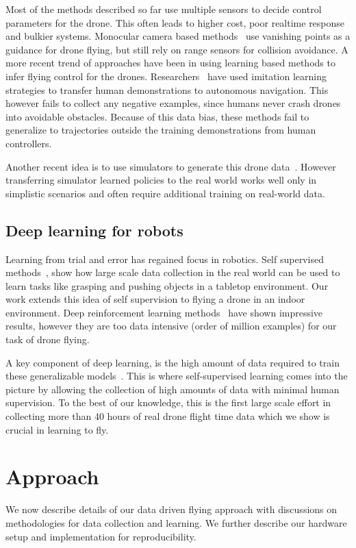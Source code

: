 \documentclass[letterpaper, 10 pt, conference]{ieeeconf}  %
\begin{document}
Most of the methods described so far use multiple sensors to decide control parameters for the drone. This often leads to higher cost, poor realtime response and bulkier systems. Monocular camera based methods~\cite{bills2011autonomous} use vanishing points as a guidance for drone flying, but still rely on range sensors for collision avoidance. A more recent trend of approaches have been in using learning based methods to infer flying control for the drones. Researchers~\cite{ross2013learning} have used imitation learning strategies to transfer human demonstrations to autonomous navigation. This however fails to collect any negative examples, since humans never crash drones into avoidable obstacles. Because of this data bias, these methods fail to generalize to trajectories outside the training demonstrations from human controllers.

Another recent idea is to use simulators to generate this drone data~\cite{dey_MSR,DBLP:journals/corr/SadeghiL16}. However transferring simulator learned policies to the real world works well only in simplistic scenarios and often require additional training on real-world data.

\subsection{Deep learning for robots}
Learning from trial and error has regained focus in robotics. Self supervised methods~\cite{ levine2016learning, agrawal2016learning, DBLP:journals/corr/PintoG16, pinto2016supersizing}, show how large scale data collection in the real world can be used to learn tasks like grasping and pushing objects in a tabletop environment. Our work extends this idea of self supervision to flying a drone in an indoor environment. Deep reinforcement learning methods~\cite{mnih2015human} have shown impressive results, however they are too data intensive (order of million examples) for our task of drone flying.

A key component of deep learning, is the high amount of data required to train these generalizable models~\cite{krizhevsky2012imagenet,girshick2014rich}. This is where self-supervised learning comes into the picture by allowing the collection of high amounts of data with minimal human supervision. To the best of our knowledge, this is the first large scale effort in collecting more than 40 hours of real drone flight time data which we show is crucial in learning to fly. 
\section{Approach}
We now describe details of our data driven flying approach with discussions on methodologies for data collection and learning. We further describe our hardware setup and implementation for reproducibility. 
\end{document}
